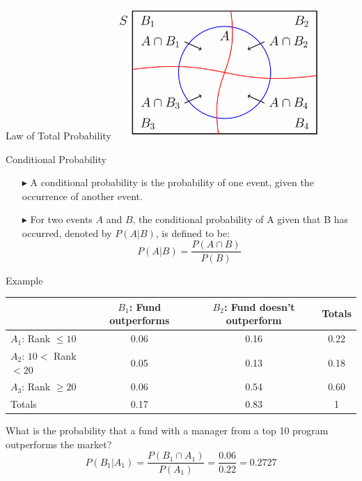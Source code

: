 \documentclass[12pt]{beamer}
\begin{document}
\begin{frame}{Law of Total Probability}
	\centering
	\includegraphics[width=8cm]{total.png}
\end{frame}
\begin{frame}{Conditional Probability}
\begin{itemize}
\item[\color{blue}$\blacktriangleright$] A conditional probability is the probability of one event, given the occurrence of another event.
\item[\color{blue}$\blacktriangleright$] For two events $A$ and $B$, the conditional probability of A given that B has occurred, denoted by $P(A|B)$, is defined to be:
$$P(A|B)=\frac{P(A\cap B)}{P(B)}$$
\end{itemize}
\end{frame}
\begin{frame}{Example}
	\begin{center}
		\begin{tabular}{lccc}
			\toprule
			&\parbox[t]{3cm}{$B_1$: Fund \\outperforms} &\parbox[t]{3cm}{$B_2$: Fund doesn't\\ outperform}&Totals\\
			\hline
			$A_1$: Rank $\le10$&0.06&0.16&0.22\\
			$A_2$: $10<$ Rank $<20$&0.05&0.13&0.18\\
			$A_3$: Rank $\ge20$&0.06&0.54&0.60\\
			\hline
			Totals&0.17&0.83&1\\
			\bottomrule
		\end{tabular}
	\end{center}
What is the probability that a fund with a manager from a top 10 program outperforms the market?
$$P(B_1|A_1)=\frac{P(B_1\cap A_1)}{P(A_1)}=\frac{0.06}{0.22}=0.2727$$
\end{frame}
\end{document}
